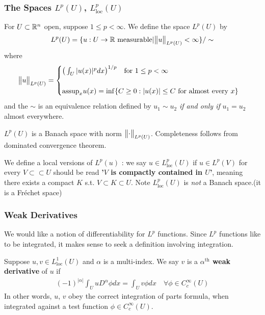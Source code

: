 \documentclass[10pt,a4paper]{report}
\begin{document}
\subsubsection*{The Spaces $L^p(U)$, $L^p_{\text{loc}}(U)$}

For $U\subset\mathbb{R}^n$ open, suppose $1\leq p<\infty$. We define the space $L^p(U)$ by
\begin{align*}
L^p(U) = \{ u:U\rightarrow \mathbb{R} \text{ measurable}| \bigl\lVert u\bigr\rVert_{L^p(U)} <\infty \} / \sim
\end{align*}
where
\begin{align*}
\bigl\lVert u\bigr\rVert_{L^p(U)} = \begin{cases}
\big( \int_{U} |u(x)|^p dx \big)^{1/p} \quad \text{for } 1\leq p <\infty \\
\\
\text{assup}_x u(x) = \inf \{C\geq 0 : |u(x)| \leq C \text{ for almost every } x \}
\end{cases}
\end{align*}
and the $\sim$ is an equivalence relation defined by $u_1 \sim u_2$ \emph{if and only if} $u_1 = u_2$ almost everywhere.

$L^p(U)$ is a Banach space with norm $\bigl\lVert\cdot\bigr\rVert_{L^p(U)}$. Completeness follows from dominated convergence theorem.
\s

We define a local versions of $L^p(u)$ : we say $u\in L^p_{\text{loc}}(U)$ if $u\in L^p(V)$ for every $V \subset\subset U$ should be read \textbf{'$V$ is compactly contained in $U$'}, meaning there exists a compact $K$ s.t. $V\subset K \subset U$. Note $L^p_{\text{loc}}(U)$ is \emph{not} a Banach space.(it is a Fr\'{e}chet space)

\subsubsection*{Weak Derivatives}

We would like a notion of differentiability for $L^p$ functions. Since $L^p$ functions like to be integrated, it makes sense to seek a definition involving integration.
\s

 Suppose $u,v\in L^1_{\text{loc}}(U)$ and $\alpha$ is a multi-index. We say $v$ is a \textbf{$\alpha^{\text{th}}$ weak derivative} of $u$ if
\begin{align*}
(-1)^{|\alpha|} \int_{U} uD^{\alpha} \phi dx = \int_U v\phi dx \quad \forall \phi \in C^{\infty}_c(U)
\end{align*}
In other words, $u$, $v$ obey the correct integration of parts formula, when integrated against a test function $\phi \in C^{\infty}_c(U)$.
\s
\end{document}
